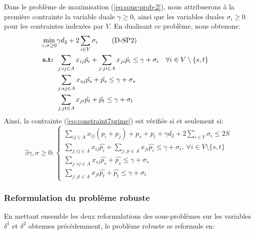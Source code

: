 \documentclass{article}
\begin{document}
Dans le problème de maximisation (\ref{eq:sous-prob-2}), nous attribuerons à la première contrainte la variable duale $\gamma \geq 0$, ainsi que les variables duales $\sigma_{i} \geq 0$ pour les contraintes indexées par $V$. En dualisant ce problème, nous obtenons:
\begin{align}
  \min_{\gamma, \sigma \geq 0} & \gamma d_2 + 2 \sum_{i \in V} \sigma_i \tag{D-SP2} \label{eq:dual-sous-prob-2}\\
   \textbf{s.t: } & \sum_{j: ij \in A} x_{ij} \hat{p_i} + \sum_{j: ji \in A} x_{ji} \hat{p_i} \leq \gamma + \sigma_i && \forall i \in V \setminus{\{s,t\}} \notag \\
   & \sum_{j: sj \in A} x_{sj} \hat{p_s} + \hat{p_s} \leq \gamma + \sigma_s \notag \\
   & \sum_{j: jt \in A} x_{jt} \hat{p_t} + \hat{p_t} \leq \gamma + \sigma_t \notag
\end{align}
Ainsi, la contrainte (\ref{eq:constraint7prime}) est vérifiée si et seulement si: 
$$\exists \gamma, \sigma \geq 0 : 
\begin{cases}
  \sum_{ij \in A} x_{ij} (p_i + p_j) + p_s + p_t + \gamma d_2 + 2 \sum_{i \in V} \sigma_i  \leq 2S\\
  \sum_{j: ij \in A} x_{ij} \hat{p_i} + \sum_{j: ji \in A} x_{ji} \hat{p_i} \leq \gamma + \sigma_i, \ \forall i \in V \setminus{\{s,t\}}  \\
   \sum_{j: sj \in A} x_{sj} \hat{p_s} + \hat{p_s} \leq \gamma + \sigma_s  \\
   \sum_{j: jt \in A} x_{jt} \hat{p_t} + \hat{p_t} \leq \gamma + \sigma_t 
\end{cases}
$$

\subsubsection{Reformulation du problème robuste}

En mettant ensemble les deux reformulations des sous-problèmes sur les variables $\delta^{1}$ et $\delta^{2}$ obtenues précédemment, le problème robuste se reformule en:
\end{document}
